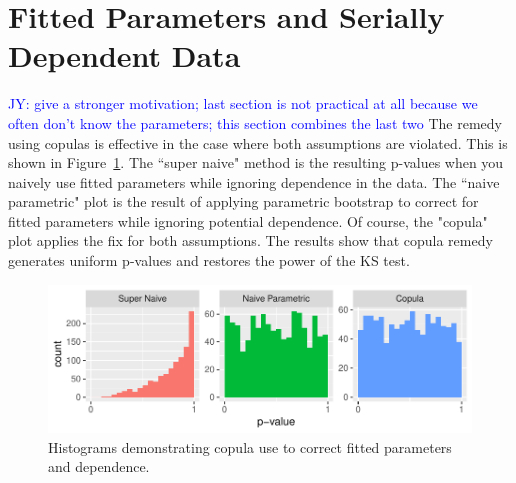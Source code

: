 \documentclass[12pt, letterpaper, titlepage]{article}
\newcommand{\jy}[1]{\textcolor{blue}{JY: #1}}
\begin{document}
\section{Fitted Parameters and Serially Dependent Data}\label{sec:fittedwithdependence}

\jy{give a stronger motivation; last section is not practical at all because we
  often don't know the parameters; this section combines the last two}
The remedy using copulas is effective in the case where both assumptions are violated.
This is shown in Figure~\ref{fig:hist_ar1_FD}. The ``super naive" method is the resulting 
p-values when you naively use fitted parameters while ignoring dependence in the data.
The ``naive parametric" plot is the result of applying parametric bootstrap to correct
for fitted parameters while ignoring potential dependence. Of course, the "copula" 
plot applies the fix for both assumptions. The results show that copula remedy generates 
uniform p-values and restores the power of the KS test.

\begin{figure}[tbp]
  \centering
  \includegraphics{hist_ar1_FD}
  \caption{Histograms demonstrating copula use to correct fitted parameters and dependence.}
  \label{fig:hist_ar1_FD}
\end{figure}
\end{document}
